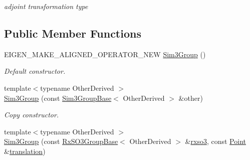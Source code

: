 \begin{DoxyCompactItemize}
\begin{DoxyCompactList}\small\item\em adjoint transformation type \end{DoxyCompactList}\end{DoxyCompactItemize}
\subsection*{Public Member Functions}
\begin{DoxyCompactItemize}
\item 
E\+I\+G\+E\+N\+\_\+\+M\+A\+K\+E\+\_\+\+A\+L\+I\+G\+N\+E\+D\+\_\+\+O\+P\+E\+R\+A\+T\+O\+R\+\_\+\+N\+EW \hyperlink{class_sophus_1_1_sim3_group_a61cd6b6dd6a6700f56f3c1ed976ccf5a}{Sim3\+Group} ()
\begin{DoxyCompactList}\small\item\em Default constructor. \end{DoxyCompactList}\item 
{\footnotesize template$<$typename Other\+Derived $>$ }\\\hyperlink{class_sophus_1_1_sim3_group_a6cc33ac145da6d0597ceebb4f96b79c8}{Sim3\+Group} (const \hyperlink{class_sophus_1_1_sim3_group_base}{Sim3\+Group\+Base}$<$ Other\+Derived $>$ \&other)\hypertarget{class_sophus_1_1_sim3_group_a6cc33ac145da6d0597ceebb4f96b79c8}{}\label{class_sophus_1_1_sim3_group_a6cc33ac145da6d0597ceebb4f96b79c8}

\begin{DoxyCompactList}\small\item\em Copy constructor. \end{DoxyCompactList}\item 
{\footnotesize template$<$typename Other\+Derived $>$ }\\\hyperlink{class_sophus_1_1_sim3_group_aa6ffffa0d01b174133e8ab5dd53d4e96}{Sim3\+Group} (const \hyperlink{class_sophus_1_1_rx_s_o3_group_base}{Rx\+S\+O3\+Group\+Base}$<$ Other\+Derived $>$ \&\hyperlink{class_sophus_1_1_sim3_group_a4f8602d647961667444f0cb19fb553b1}{rxso3}, const \hyperlink{class_sophus_1_1_sim3_group_a1848018ed54875cbfe8fc437cb02237d}{Point} \&\hyperlink{class_sophus_1_1_sim3_group_ace8b98b369832930e647675b8c005d64}{translation})\hypertarget{class_sophus_1_1_sim3_group_aa6ffffa0d01b174133e8ab5dd53d4e96}{}\label{class_sophus_1_1_sim3_group_aa6ffffa0d01b174133e8ab5dd53d4e96}


\end{DoxyCompactItemize}
